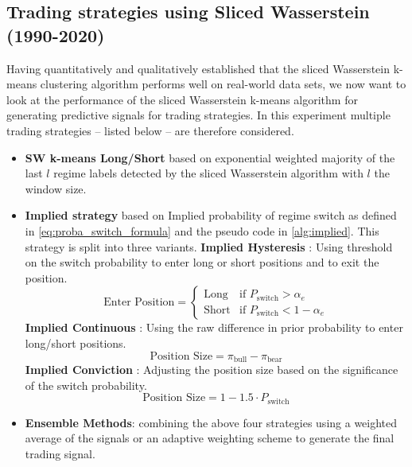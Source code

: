 \documentclass[12pt,a4paper]{report}
\begin{document}
\subsection{Trading strategies using Sliced Wasserstein (1990-2020)}
Having quantitatively and qualitatively established that the sliced Wasserstein k-means clustering algorithm performs well on real-world data sets, we now want to look at the performance of the sliced Wasserstein k-means algorithm for generating predictive signals for trading strategies.
In this experiment multiple trading strategies -- listed below --  are therefore considered.   
\begin{itemize}
\item \textbf{SW k-means Long/Short} based on exponential weighted majority of the last $l$ regime labels detected by the sliced Wasserstein algorithm with $l$ the window size. 
\item \textbf{Implied strategy} based on Implied probability of regime switch as defined in \ref{eq:proba_switch_formula} and the pseudo code in \ref{alg:implied}. This strategy is
  split into three variants.
  \subitem \textbf{Implied Hysteresis} : Using threshold on the switch probability to enter long or short positions and to exit the position.
    \begin{equation}
      \text{Enter Position} = \begin{cases}
        \text{Long} & \text{if } P_{\text{switch}} > \alpha_e \\
        \text{Short} & \text{if } P_{\text{switch}} < 1 - \alpha_e
      \end{cases}
    \end{equation}
  \subitem \textbf{Implied Continuous} : Using the raw difference in prior probability to enter long/short positions. 
    \begin{equation}
      \text{Position Size} = \pi_{\text{bull}} - \pi_{\text{bear}}
    \end{equation}
  \subitem \textbf{Implied Conviction} : Adjusting the position size based on the significance of the switch probability.
    \begin{equation}
      \text{Position Size} = 1 - 1.5 \cdot P_{\text{switch}}
    \end{equation}
\item \textbf{Ensemble Methods}: combining the above four strategies using a weighted average of the signals or an adaptive weighting scheme to generate the final trading signal.
\end{itemize}
\end{document}
